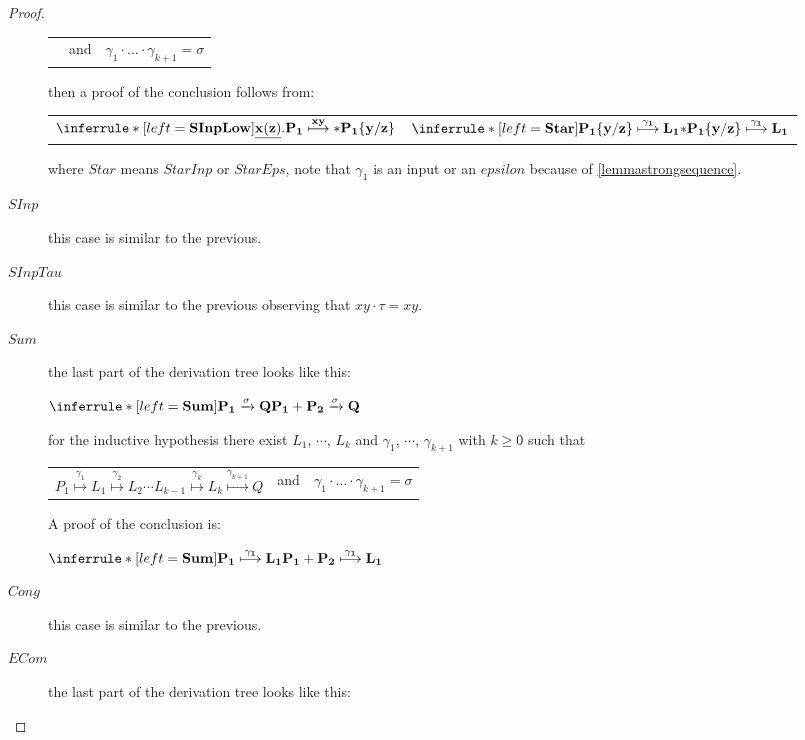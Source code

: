 \begin{proposition}
\begin{proof}
\begin{description}
\begin{center}
\begin{tabular}{lll}
	      &
		and
	      &
		$\gamma_{1} \cdot \ldots \cdot \gamma_{k+1} = \sigma$
	      \end{tabular}
	    \end{center}
	    then a proof of the conclusion follows from:
	    \begin{center}
	      \begin{tabular}{ll}
		$\inferrule* [left=\bf{SInpLow}]{
 		}{
 		  \underline{x(z)}.P_{1} \stackrel{xy}{\longmapsto} *P_{1}\{y/z\}
 		}$
	      &
		$\inferrule* [left=\bf{Star}]{
 		  P_{1}\{y/z\} \stackrel{\gamma_{1}}{\longmapsto} L_{1}
 		}{
 		  *P_{1}\{y/z\} \stackrel{\gamma_{1}}{\longmapsto} L_{1}
 		}$
	      \end{tabular}
	    \end{center}
	    where $Star$ means $StarInp$ or $StarEps$, note that $\gamma_{1}$ is an input or an $epsilon$ because of \ref{lemmastrongsequence}.
	  \item[$SInp$] this case is similar to the previous.
	  \item[$SInpTau$] this case is similar to the previous observing that $xy \cdot \tau = xy$.
	  \item[$Sum$]
	the last part of the derivation tree looks like this:
	\begin{center}
	  $\inferrule* [left=\bf{Sum}]{
	    P_{1} \xrightarrow{\sigma} Q
	  }{
	    P_{1}+P_{2} \xrightarrow{\sigma} Q
	  }$
	\end{center}
	for the inductive hypothesis there exist $L_{1}$, $\cdots$, $L_{k}$ and $\gamma_{1}$, $\cdots$, $\gamma_{k+1}$ with $k\geq 0$ such that 
	\begin{center}
	  \begin{tabular}{lll}
	    $P_{1} \stackrel{\gamma_{1}}{\longmapsto} L_{1}  \stackrel{\gamma_{2}}{\longmapsto} L_{2} \cdots L_{k-1} \stackrel{\gamma_{k}}{\longmapsto} L_{k} \stackrel{\gamma_{k+1}}{\longmapsto} Q$ 
	  &
	    and
	  &
	    $\gamma_{1} \cdot \ldots \cdot \gamma_{k+1} = \sigma$  
	  \end{tabular}
	\end{center}
	A proof of the conclusion is:
	\begin{center}
	  $\inferrule* [left=\bf{Sum}]{
	      P_{1} \stackrel{\gamma_{1}}{\longmapsto} L_{1}
	    }{
	      P_{1}+P_{2} \stackrel{\gamma_{1}}{\longmapsto} L_{1}
	    }
	  $
	\end{center}
      \item[$Cong$] this case is similar to the previous.
      \item[$ECom$] 
	the last part of the derivation tree looks like this:

\end{description}
\end{proof}
\end{proposition}
